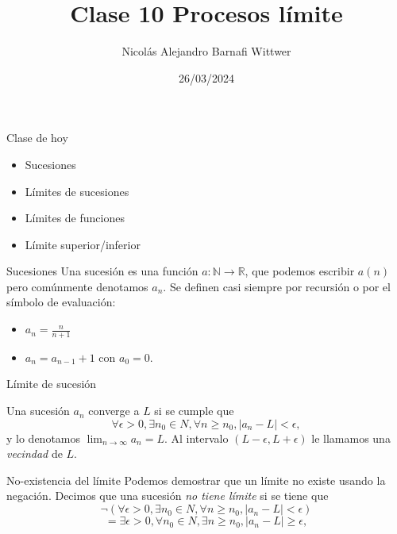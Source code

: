 \documentclass[14pt,aspectratio=169,xcolor=dvipsnames]{beamer}
\title[short title]{Clase 10 Procesos límite}
\subtitle{}
\author[NA Barnafi] {Nicolás Alejandro Barnafi Wittwer}
\institute[UC|CMM] 
{
    Pontificia Universidad Católica de Chile \\
    Centro de Modelamiento Matemático
}
\date{26/03/2024}
\newcommand{\R}{\mathbb{R}}
\begin{document}
\begin{frame}
    \maketitle
\end{frame}
\begin{frame}{Clase de hoy}
    \begin{itemize}
        \item Sucesiones
        \item Límites de sucesiones
        \item Límites de funciones
        \item Límite superior/inferior
    \end{itemize}

    \vspace{1cm}
\end{frame}
\begin{frame}{Sucesiones}
    Una sucesión es una función $a:\mathbb N\to \R$, que podemos escribir $a(n)$ pero comúnmente denotamos $a_n$. Se definen casi siempre por recursión o por el símbolo de evaluación:
    \begin{itemize}
        \item $a_n = \frac{n}{n+1}$
        \item $a_n = a_{n-1} + 1$ con $a_0 = 0$. 
    \end{itemize}
\end{frame}
\begin{frame}{Límite de sucesión}
    \begin{block}{}
        Una sucesión $a_n$ converge a $L$ si se cumple que
            $$ \forall \epsilon > 0, \exists n_0\in N, \forall n\geq n_0, |a_n - L | < \epsilon, $$
            y lo denotamos $\lim_{n\to\infty} a_n = L$. Al intervalo $(L-\epsilon, L+\epsilon)$ le llamamos una \emph{vecindad} de $L$.
    \end{block}
\end{frame}
\begin{frame}{No-existencia del límite}
    Podemos demostrar que un límite no existe usando la negación. Decimos que una sucesión \emph{no tiene límite} si se tiene que
            $$ \neg(\forall \epsilon > 0, \exists n_0\in N, \forall n\geq n_0, |a_n - L | < \epsilon) $$
            $$ =\exists \epsilon > 0, \forall n_0\in N, \exists n\geq n_0, |a_n - L | \geq \epsilon, $$
\end{frame}
\end{document}
